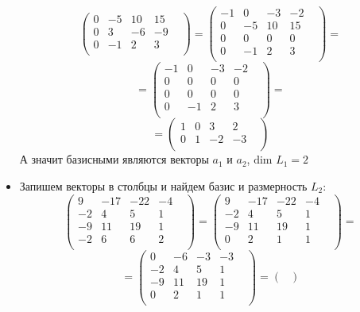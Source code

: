 \documentclass[a4paper,12pt]{article}
\begin{document}
\begin{itemize}
\[\begin{pmatrix}
0 & -5 & 10 & 15 & \\
0 & 3 & -6 & -9 & \\
0 & -1 & 2 & 3 & \\
\end{pmatrix}
=
\begin{pmatrix}
-1 & 0 & -3 & -2 & \\
0 & -5 & 10 & 15 & \\
0 & 0 & 0 & 0 & \\
0 & -1 & 2 & 3 & \\
\end{pmatrix}
=
\]
\[
=
\begin{pmatrix}
-1 & 0 & -3 & -2 & \\
0 & 0 & 0 & 0 & \\
0 & 0 & 0 & 0 & \\
0 & -1 & 2 & 3 & \\
\end{pmatrix}
=
\]
\begin{equation*}
=
\begin{pmatrix}
1 & 0 & 3 & 2 & \\
0 & 1 & -2 & -3 & \\
\end{pmatrix}
\end{equation*}
А значит базисными являются векторы $a_1$ и $a_2$, $\text{dim } L_1 = 2$
\item
Запишем векторы в столбцы и найдем базис и размерность $L_2$:
\[
\begin{pmatrix}
9 & -17 & -22 & -4 & \\
-2 & 4 & 5 & 1 & \\
-9 & 11 & 19 & 1 & \\
-2 & 6 & 6 & 2 & \\
\end{pmatrix}
=
\begin{pmatrix}
9 & -17 & -22 & -4 & \\
-2 & 4 & 5 & 1 & \\
-9 & 11 & 19 & 1 & \\
0 & 2 & 1 & 1 & \\
\end{pmatrix}
=
\]
\[
=
\begin{pmatrix}
0 & -6 & -3 & -3 & \\
-2 & 4 & 5 & 1 & \\
-9 & 11 & 19 & 1 & \\
0 & 2 & 1 & 1 & \\
\end{pmatrix}
=
\begin{pmatrix}

\end{pmatrix}\]
\end{itemize}
\end{document}
